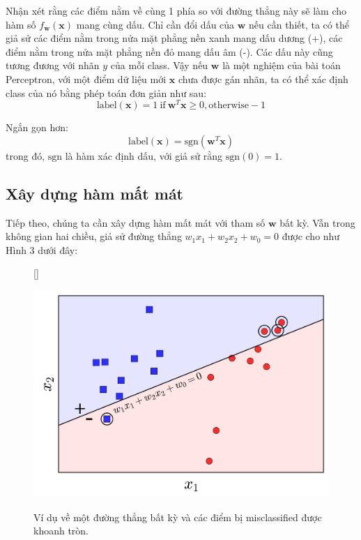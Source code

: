  
Nhận xét rằng các điểm nằm về cùng 1 phía so với đường thẳng này sẽ làm cho hàm số $f_{\mathbf{w}}(\mathbf{x})$ mang cùng dấu. Chỉ cần đổi dấu của $\mathbf{w}$ nếu cần thiết, ta có thể giả sử các điểm nằm trong nửa mặt phẳng nền xanh mang dấu dương (+), các điểm nằm trong nửa mặt phẳng nền đỏ mang dấu âm (-). Các dấu này cũng tương đương với nhãn $y$ của mỗi class. Vậy nếu $\mathbf{w}$ là một nghiệm của bài toán Perceptron, với một điểm dữ liệu mới $\mathbf{x}$ chưa được gán nhãn, ta có thể xác định class của nó bằng phép toán đơn giản như sau: 
\begin{equation} 
\text{label}(\mathbf{x}) = 1 ~\text{if}~ \mathbf{w}^T\mathbf{x} \geq 0, \text{otherwise} -1 
\end{equation} 
 
Ngắn gọn hơn:  
\begin{equation} 
    \text{label}(\mathbf{x}) = \text{sgn}(\mathbf{w}^T\mathbf{x}) 
\end{equation} 
trong đó, $\text{sgn}$ là hàm xác định dấu, với giả sử rằng $\text{sgn}(0) = 1$. 
 
 
\subsection{Xây dựng hàm mất mát}
Tiếp theo, chúng ta cần xây dựng hàm mất mát với tham số $\mathbf{w}$ bất kỳ. Vẫn trong không gian hai chiều, giả sử đường thẳng $w_1x_1 + w_2x_2 + w_0 = 0$ được cho như Hình 3 dưới đây: 

\begin{figure}[t]
    [\FBwidth]
    {\caption{ 
    Ví dụ về một đường thẳng bất kỳ và các điểm bị misclassified được khoanh tròn.
    }
    \label{fig:9_3}}
    { %
    \includegraphics[width=.5\textwidth]{Chapters/05_NeuralNetworks/09_perceptron/pla3.png}
    }
\end{figure}

